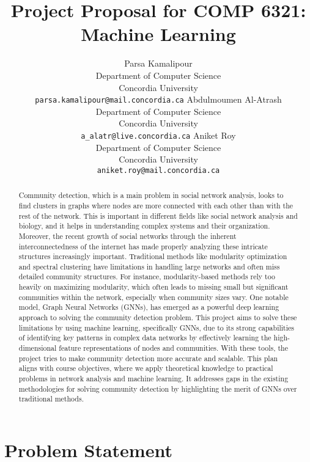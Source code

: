 \documentclass{article}
\title{Project Proposal for COMP 6321: Machine Learning}
\author{%
  Parsa Kamalipour\\
  Department of Computer Science \\
  Concordia University \\
  \texttt{parsa.kamalipour@mail.concordia.ca} 
  \And
  Abdulmoumen Al-Atrash \\
  Department of Computer Science \\
  Concordia University \\
  \texttt{a\_alatr@live.concordia.ca} 
  \And
  Aniket Roy \\
  Department of Computer Science \\
  Concordia University \\
  \texttt{aniket.roy@mail.concordia.ca} 
}
\begin{document}
\maketitle

\begin{abstract}
Community detection, which is a main problem in social network analysis, looks to find clusters in graphs where nodes are more connected with each other than with the rest of the network. This is important in different fields like social network analysis and biology, and it helps in understanding complex systems and their organization. Moreover, the recent growth of social networks through the inherent interconnectedness of the internet has made properly analyzing these intricate structures increasingly important. Traditional methods like modularity optimization and spectral clustering have limitations in handling large networks and often miss detailed community structures. For instance, modularity-based methods rely too heavily on maximizing modularity, which often leads to missing small but significant communities within the network, especially when community sizes vary. One notable model, Graph Neural Networks (GNNs), has emerged as a powerful deep learning approach to solving the community detection problem. This project aims to solve these limitations by using machine learning, specifically GNNs, due to its strong capabilities of identifying key patterns in complex data networks by effectively learning the high-dimensional feature representations of nodes and communities. With these tools, the project tries to make community detection more accurate and scalable. This plan aligns with course objectives, where we apply theoretical knowledge to practical problems in network analysis and machine learning. It addresses gaps in the existing methodologies for solving community detection by highlighting the merit of GNNs over traditional methods.
\end{abstract}

\section{Problem Statement}
\end{document}

